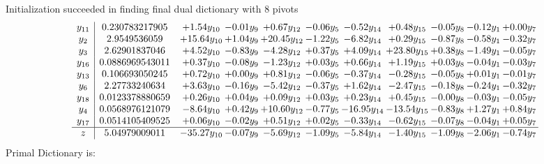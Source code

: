 \documentclass[9pt]{article}
\begin{document}
Initialization succeeded in finding final dual dictionary with 8 pivots
\[\begin{array}{c| c c@{\hskip 2pt} c@{\hskip 2pt} c@{\hskip 2pt} c@{\hskip 2pt} c@{\hskip 2pt} c@{\hskip 2pt} c@{\hskip 2pt} c@{\hskip 2pt} c@{\hskip 2pt} }
 y_{11}   &  0.230783217905 & +  1.54 y_{10} & -0.01 y_{9} & +  0.67 y_{12} & -0.06 y_{5} & -0.52 y_{14} & +  0.48 y_{15} & -0.05 y_{8} & -0.12 y_{1} & +  0.00 y_{7}\\
 y_{2}   &  2.9549536059 & + 15.64 y_{10} & +  1.04 y_{9} & + 20.45 y_{12} & -1.22 y_{5} & -6.82 y_{14} & +  0.29 y_{15} & -0.87 y_{8} & -0.58 y_{1} & -0.32 y_{7}\\
 y_{3}   &  2.62901837046 & +  4.52 y_{10} & -0.83 y_{9} & -4.28 y_{12} & +  0.37 y_{5} & +  4.09 y_{14} & + 23.80 y_{15} & +  0.38 y_{8} & -1.49 y_{1} & -0.05 y_{7}\\
 y_{16}   &  0.0886969543011 & +  0.37 y_{10} & -0.08 y_{9} & -1.23 y_{12} & +  0.03 y_{5} & +  0.66 y_{14} & +  1.19 y_{15} & +  0.03 y_{8} & -0.04 y_{1} & -0.03 y_{7}\\
 y_{13}   &  0.106693050245 & +  0.72 y_{10} & +  0.00 y_{9} & +  0.81 y_{12} & -0.06 y_{5} & -0.37 y_{14} & -0.28 y_{15} & -0.05 y_{8} & +  0.01 y_{1} & -0.01 y_{7}\\
 y_{6}   &  2.27733240634 & +  3.63 y_{10} & -0.16 y_{9} & -5.42 y_{12} & -0.37 y_{5} & +  1.62 y_{14} & -2.47 y_{15} & -0.18 y_{8} & -0.24 y_{1} & -0.32 y_{7}\\
 y_{18}   &  0.0123378880659 & +  0.26 y_{10} & +  0.04 y_{9} & +  0.09 y_{12} & +  0.03 y_{5} & +  0.23 y_{14} & +  0.45 y_{15} & -0.00 y_{8} & -0.03 y_{1} & -0.05 y_{7}\\
 y_{4}   &  0.0568976121079 & -8.64 y_{10} & +  0.42 y_{9} & + 10.60 y_{12} & -0.77 y_{5} & -16.95 y_{14} & -13.54 y_{15} & -0.83 y_{8} & +  1.27 y_{1} & +  0.84 y_{7}\\
 y_{17}   &  0.0514105409525 & +  0.06 y_{10} & -0.02 y_{9} & +  0.51 y_{12} & +  0.02 y_{5} & -0.33 y_{14} & -0.62 y_{15} & -0.07 y_{8} & -0.04 y_{1} & +  0.05 y_{7}\\
\hline
z    &  5.04979009011 & -35.27 y_{10} & -0.07 y_{9} & -5.69 y_{12} & -1.09 y_{5} & -5.84 y_{14} & -1.40 y_{15} & -1.09 y_{8} & -2.06 y_{1} & -0.74 y_{7}\\
\end{array}\]
Primal Dictionary is:
\end{document}
